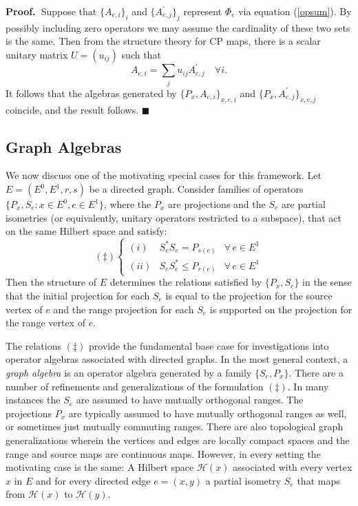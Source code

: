 \documentclass[12pt]{amsart}
\theoremstyle{plain}
\theoremstyle{definition}
\newcommand{\Prf}{\noindent\textbf{Proof.\ }}
\newcommand{\bx}{\hfill$\blacksquare$\medbreak}
\renewcommand{\H}{{\mathcal{H}}}
\begin{document}
\Prf Suppose that $\{A_{e,i}\}_i$ and $\{A_{e,j}^\prime\}_j$
represent $\Phi_e$ via  equation (\ref{opsum}). By possibly
including zero operators we may assume the cardinality of these
two sets is the same. Then from the structure theory for CP maps,
there is a scalar unitary matrix $U=(u_{ij})$ such that
\[
A_{e,i} = \sum_j u_{ij} A_{e,j}^\prime \quad \forall i.
\]
It follows that the algebras generated by
$\{P_x,A_{e,i}\}_{x,e,i}$ and $\{P_x,A_{e,j}^\prime\}_{x,e,j}$
coincide, and the result follows.
 \bx


\subsection{Graph Algebras}\label{sS:graphalg}

We now discuss one of the motivating special cases for this
framework. Let $E=(E^0,E^1,r,s)$ be a directed graph. Consider
families of operators $\{P_x,S_e: x\in E^0, e\in E^1\}$, where the
$P_x$ are projections and the $S_e$ are partial isometries (or
equivalently, unitary operators restricted to a subspace), that
act on the same Hilbert space and satisfy:
\[
(\ddagger)\left\{
\begin{array}{lll}
(i) & S_{e}^{*}S_e = P_{s(e)} & \mbox{$\forall\, e \in E^1$} \\
(ii) & S_{e}S_e^* \leq P_{r(e)} & \mbox{$\forall\, e\in E^1$}
\end{array}\right.
\]
Then the structure of $E$ determines the relations satisfied by
$\{P_x,S_e\}$ in the sense that the initial projection for each
$S_e$ is equal to the projection for the source vertex of $e$ and
the range projection for each $S_e$ is supported on the projection
for the range vertex of $e$.

The relations $(\ddagger)$ provide the fundamental base case for
investigations into operator algebras associated with directed
graphs. In the most general context, a {\it graph algebra} is an
operator algebra generated by a family $\{S_e,P_x\}$. There are a
number of refinements and generalizations of the formulation
$(\ddagger)$. In many instances the $S_e$ are assumed to have
mutually orthogonal ranges. The projections $P_x$ are typically
assumed to have mutually orthogonal ranges as well, or sometimes
just mutually commuting ranges. There are also topological graph
generalizations wherein the vertices and edges are locally compact
spaces and the range and source maps are continuous maps. However,
in every setting the motivating case is the same: A Hilbert space
$\H(x)$ associated with every vertex $x$ in $E$ and for every
directed edge $e=(x,y)$ a partial isometry $S_e$ that maps from
$\H(x)$ to $\H(y)$.
\end{document}
